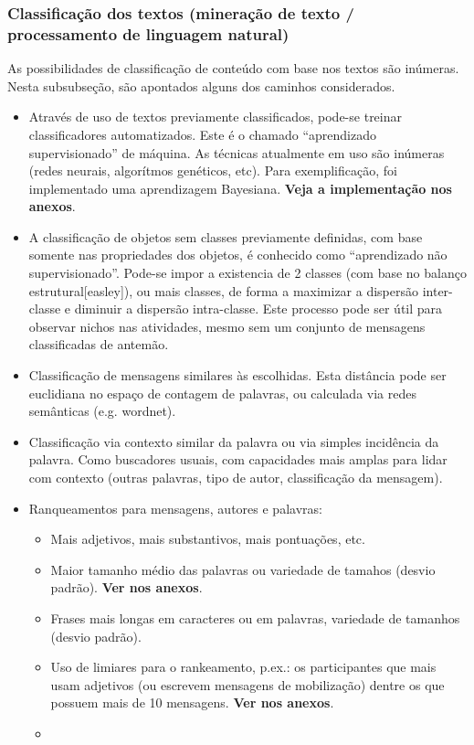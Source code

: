 \documentclass[12pt]{article}
\begin{document}
\subsubsection{Classificação dos textos (mineração de texto / processamento de linguagem natural)}
As possibilidades de classificação de conteúdo com base nos textos são inúmeras. Nesta subsubseção, são apontados alguns dos caminhos considerados.
\begin{itemize}
    \item Através de uso de textos previamente classificados, pode-se treinar classificadores automatizados. Este é o chamado “aprendizado supervisionado” de máquina. As técnicas atualmente em uso são inúmeras (redes neurais, algorítmos genéticos, etc). Para  exemplificação, foi implementado uma aprendizagem Bayesiana. {\bf Veja a implementação nos anexos}.
    \item A classificação de objetos sem classes previamente definidas, com base somente nas propriedades dos objetos, é conhecido como ``aprendizado não supervisionado''. Pode-se impor a existencia de 2 classes (com base no balanço estrutural[easley]), ou mais classes, de forma a maximizar a dispersão inter-classe e diminuir a dispersão intra-classe. Este processo pode ser útil para observar nichos nas atividades, mesmo sem um conjunto de mensagens classificadas de antemão.
    \item Classificação de mensagens similares às escolhidas. Esta distância pode ser euclidiana no espaço de contagem de palavras, ou calculada via redes semânticas (e.g. wordnet).
    \item Classificação via contexto similar da palavra ou via simples incidência da palavra. Como buscadores usuais, com capacidades mais amplas para lidar com contexto (outras palavras, tipo de autor, classificação da mensagem).
    \item Ranqueamentos para mensagens, autores e palavras:

\begin{itemize}
        \item Mais adjetivos, mais substantivos, mais pontuações, etc. 
        \item Maior tamanho médio das palavras ou variedade de tamahos (desvio padrão). {\bf Ver nos anexos}.
        \item Frases mais longas em caracteres ou em palavras, variedade de tamanhos (desvio padrão).
        \item Uso de limiares para o rankeamento, p.ex.: os participantes que mais usam adjetivos (ou escrevem mensagens de mobilização) dentre os que possuem mais de 10 mensagens. {\bf Ver nos anexos}.
        \item 
\end{itemize}
\end{itemize}
\end{document}
